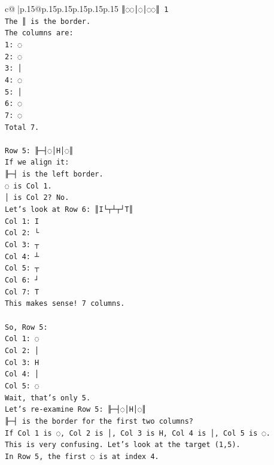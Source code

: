 \documentclass{article}
\begin{document}
{\begin{supertabular}{c@{$\;$}|p{.15\linewidth}@{}p{.15\linewidth}p{.15\linewidth}p{.15\linewidth}p{.15\linewidth}p{.15\linewidth}}
{{{\texttt{║◌◌│◌│◌◌║ 1} \\
\texttt{The ║ is the border.} \\
\texttt{The columns are:} \\
\texttt{1: ◌} \\
\texttt{2: ◌} \\
\texttt{3: │} \\
\texttt{4: ◌} \\
\texttt{5: │} \\
\texttt{6: ◌} \\
\texttt{7: ◌} \\
\texttt{Total 7.} \\
\\ 
\texttt{Row 5: ╟─┤◌│H│◌║} \\
\texttt{If we align it:} \\
\texttt{╟─┤ is the left border.} \\
\texttt{◌ is Col 1.} \\
\texttt{│ is Col 2? No.} \\
\texttt{Let's look at Row 6: ║I└┬┴┬┘T║} \\
\texttt{Col 1: I} \\
\texttt{Col 2: └} \\
\texttt{Col 3: ┬} \\
\texttt{Col 4: ┴} \\
\texttt{Col 5: ┬} \\
\texttt{Col 6: ┘} \\
\texttt{Col 7: T} \\
\texttt{This makes sense! 7 columns.} \\
\\ 
\texttt{So, Row 5:} \\
\texttt{Col 1: ◌} \\
\texttt{Col 2: │} \\
\texttt{Col 3: H} \\
\texttt{Col 4: │} \\
\texttt{Col 5: ◌} \\
\texttt{Wait, that's only 5.} \\
\texttt{Let's re{-}examine Row 5: ╟─┤◌│H│◌║} \\
\texttt{╟─┤ is the border for the first two columns?} \\
\texttt{If Col 1 is ◌, Col 2 is │, Col 3 is H, Col 4 is │, Col 5 is ◌.} \\
\texttt{This is very confusing. Let's look at the target (1,5).} \\
\texttt{In Row 5, the first ◌ is at index 4.} \\
}}}
\end{supertabular}}
\end{document}

